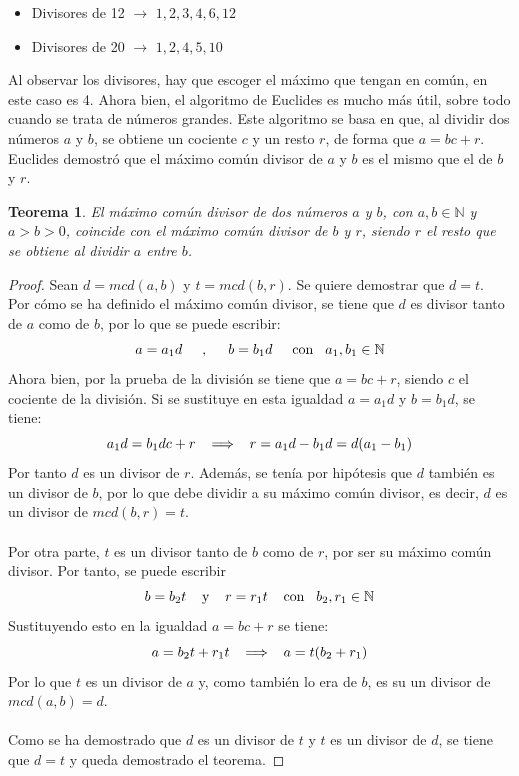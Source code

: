 \documentclass[a4paper, openright, 11pt, titlepage]{report}
\newtheorem{teor}[propo]{Teorema}
\theoremstyle{definition}\newtheorem{defin}[propo]{Definition}
\theoremstyle{definition}\newtheorem{obser}[propo]{Remark}
\theoremstyle{definition}\newtheorem{ejem}[propo]{Ejemplo}
\theoremstyle{definition}\newtheorem{algoritmo}[propo]{Algoritmo}
\begin{document}
\begin{itemize}
    \item Divisores de 12 $\longrightarrow$ ${1, 2, 3, \boxed{4}, 6, 12}$
    \item Divisores de 20 $\longrightarrow$ ${1, 2, \boxed{4}, 5, 10}$
\end{itemize}
Al observar los divisores, hay que escoger el máximo que tengan en común, en este caso es 4. 
Ahora bien, el algoritmo de Euclides es mucho más útil, sobre todo cuando se trata de números grandes. Este algoritmo se basa en que, al dividir dos números $a$ y $b$, se obtiene un cociente $c$ y un resto $r$, de forma que $a = bc + r$. Euclides demostró que el máximo común divisor de $a$ y $b$ es el mismo que el de $b$ y $r$. 
\begin{teor}
El máximo común divisor de dos números $a$ y $b$, con $a, b \in \mathbb{N}$ y $a>b>0$, coincide con el máximo común divisor de $b$ y $r$, siendo $r$ el resto que se obtiene al dividir $a$ entre $b$.
\end{teor}
\begin{proof}
Sean $d = mcd(a,b)$ y $t = mcd(b,r)$. Se quiere demostrar que $d = t$.\\
Por cómo se ha definido el máximo común divisor, se tiene que $d$ es divisor tanto de $a$ como de $b$, por lo que se puede escribir:
$$a = a_{1}d \hspace{0.5cm}, \hspace{0.5cm} b = b_{1}d \hspace{0.5cm} \text{con} \hspace{0.3cm} a_{1},b_{1} \in \mathbb{N}$$
Ahora bien, por la prueba de la división se tiene que $a = bc + r$, siendo $c$ el cociente de la división. Si se sustituye en esta igualdad $a = a_{1}d$ y $b = b_{1}d$, se tiene: 
$$a_{1}d = b_{1}dc + r \hspace{0.3cm}\Longrightarrow\hspace{0.3cm} r = a_{1}d - b_{1}d = d(a_{1} - b_{1})$$
Por tanto $d$ es un divisor de $r$. Además, se tenía por hipótesis que $d$ también es un divisor de $b$, por lo que debe dividir a su máximo común divisor, es decir, $d$ es un divisor de $mcd(b,r) = t$.\\\\
Por otra parte, $t$ es un divisor tanto de $b$ como de $r$, por ser su máximo común divisor. Por tanto, se puede escribir 
$$b = b_{2}t \hspace{0.4cm} \text{y} \hspace{0.4cm} r = r_{1}t \hspace{0.4cm} \text{con} \hspace{0.3cm} b_{2},r_{1} \in \mathbb{N}$$ Sustituyendo esto en la igualdad $a = bc + r$ se tiene:
$$a = b_{2}t + r_{1}t \hspace{0.3cm} \Longrightarrow \hspace{0.3cm} a = t(b_{2}+r_{1})$$
Por lo que $t$ es un divisor de $a$ y, como también lo era de $b$, es su un divisor de $mcd(a,b) = d$.\\\\
Como se ha demostrado que $d$ es un divisor de $t$ y $t$ es un divisor de $d$, se tiene que $d = t$ y queda demostrado el teorema.
\end{proof}
\end{document}
